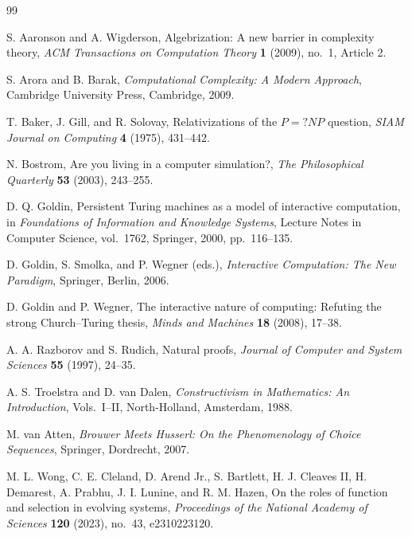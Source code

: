 \documentclass[11pt]{article}
\begin{document}
\begin{thebibliography}{99}

S. Aaronson and A. Wigderson,
Algebrization: A new barrier in complexity theory,
\emph{ACM Transactions on Computation Theory} \textbf{1} (2009), no.~1, Article 2.

S. Arora and B. Barak,
\emph{Computational Complexity: A Modern Approach},
Cambridge University Press, Cambridge, 2009.

T. Baker, J. Gill, and R. Solovay,
Relativizations of the \(P=?NP\) question,
\emph{SIAM Journal on Computing} \textbf{4} (1975), 431--442.

N. Bostrom,
Are you living in a computer simulation?,
\emph{The Philosophical Quarterly} \textbf{53} (2003), 243--255.

D. Q. Goldin,
Persistent Turing machines as a model of interactive computation,
in \emph{Foundations of Information and Knowledge Systems},
Lecture Notes in Computer Science, vol.~1762, Springer, 2000, pp.~116--135.

D. Goldin, S. Smolka, and P. Wegner (eds.),
\emph{Interactive Computation: The New Paradigm},
Springer, Berlin, 2006.

D. Goldin and P. Wegner,
The interactive nature of computing: Refuting the strong Church--Turing thesis,
\emph{Minds and Machines} \textbf{18} (2008), 17--38.

A. A. Razborov and S. Rudich,
Natural proofs,
\emph{Journal of Computer and System Sciences} \textbf{55} (1997), 24--35.

A. S. Troelstra and D. van Dalen,
\emph{Constructivism in Mathematics: An Introduction}, Vols.~I--II,
North-Holland, Amsterdam, 1988.

M. van Atten,
\emph{Brouwer Meets Husserl: On the Phenomenology of Choice Sequences},
Springer, Dordrecht, 2007.

M. L. Wong, C. E. Cleland, D. Arend Jr., S. Bartlett,
H. J. Cleaves II, H. Demarest, A. Prabhu, J. I. Lunine, and R. M. Hazen,
On the roles of function and selection in evolving systems,
\emph{Proceedings of the National Academy of Sciences}
\textbf{120} (2023), no.~43, e2310223120.

\end{thebibliography}
\end{document}
